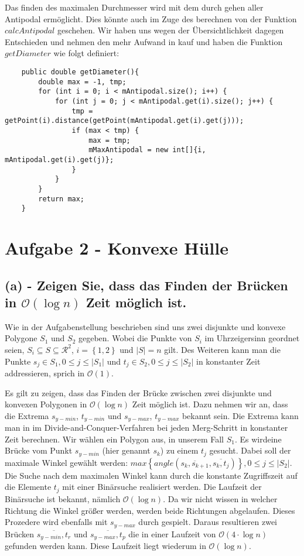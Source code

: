 \documentclass[a4paper]{article}
\begin{document}
Das finden des maximalen Durchmesser wird mit dem durch gehen aller Antipodal ermöglicht. Dies könnte auch im Zuge des berechnen von der Funktion $calcAntipodal$ geschehen. Wir haben uns wegen der Übersichtlichkeit dagegen Entschieden und nehmen den mehr Aufwand in kauf und haben die Funktion $getDiameter$ wie folgt definiert:

\begin{lstlisting}
	public double getDiameter(){
        double max = -1, tmp;
        for (int i = 0; i < mAntipodal.size(); i++) {
            for (int j = 0; j < mAntipodal.get(i).size(); j++) {
                tmp = getPoint(i).distance(getPoint(mAntipodal.get(i).get(j)));
                if (max < tmp) {
                    max = tmp;
                    mMaxAntipodal = new int[]{i, mAntipodal.get(i).get(j)};
                }
            }
        }
        return max;
    }
\end{lstlisting}

\section*{Aufgabe 2 - Konvexe Hülle}

\subsection*{(a) - Zeigen Sie, dass das Finden der Brücken in $\mathcal{O}(\log n)$ Zeit möglich ist.}

Wie in der Aufgabenstellung beschrieben sind uns zwei disjunkte und konvexe Polygone $S_1$ und $S_2$ gegeben. Wobei die Punkte von $S_i$ im Uhrzeigersinn geordnet seien, $S_i \subseteq S \subseteq \mathcal{R}^2$, $i = \left\{1, 2\right\}$ und $|S| = n$ gilt. Des Weiteren kann man die Punkte $s_j \in S_1, 0 \leq j \leq |S_1|$ und $t_j \in S_2, 0 \leq j \leq |S_2|$ in konstanter Zeit addressieren, sprich in $\mathcal{O}(1)$.

Es gilt zu zeigen, dass das Finden der Brücke zwischen zwei disjunkte und konvexen Polygonen in $\mathcal{O}(\log n)$ Zeit möglich ist. Dazu nehmen wir an, dass die Extrema $s_{y-min}$, $t_{y-min}$ und $s_{y-max}$, $t_{y-max}$ bekannt sein. Die Extrema kann man in im Divide-and-Conquer-Verfahren bei jeden Merg-Schritt in konstanter Zeit berechnen. Wir wählen ein Polygon aus, in unserem Fall $S_1$. Es wirdeine Brücke vom Punkt $s_{y-min}$ (hier genannt $s_k$) zu einem $t_j$ gesucht. Dabei soll der maximale Winkel gewählt werden: $max \left\{angle\left(\overline{s_k,s_{k+1}},\overline{s_k,t_j}\right)\right\}, 0 \leq j \leq |S_2|$. Die Suche nach dem maximalen Winkel kann durch die konstante Zugriffszeit auf die Elemente $t_j$ mit einer Binärsuche realisiert werden. Die Laufzeit der Binärsuche ist bekannt, nämlich $\mathcal{O}(\log n)$. Da wir nicht wissen in welcher Richtung die Winkel größer werden, werden beide Richtungen abgelaufen. Dieses Prozedere wird ebenfalls mit $s_{y-max}$ durch gespielt. Daraus resultieren zwei Brücken $\overline{s_{y-min}, t_r}$ und $\overline{s_{y-max}, t_p}$ die in einer Laufzeit von $\mathcal{O}(4 \cdot \log n)$ gefunden werden kann. Diese Laufzeit liegt wiederum in $\mathcal{O}(\log n)$.
\end{document}
